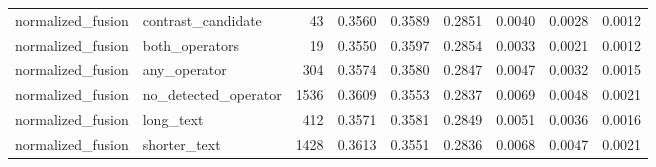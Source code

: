 \begin{tabular}{llrrrrrrr}
normalized_fusion & contrast_candidate & 43 & 0.3560 & 0.3589 & 0.2851 & 0.0040 & 0.0028 & 0.0012 \\
normalized_fusion & both_operators & 19 & 0.3550 & 0.3597 & 0.2854 & 0.0033 & 0.0021 & 0.0012 \\
normalized_fusion & any_operator & 304 & 0.3574 & 0.3580 & 0.2847 & 0.0047 & 0.0032 & 0.0015 \\
normalized_fusion & no_detected_operator & 1536 & 0.3609 & 0.3553 & 0.2837 & 0.0069 & 0.0048 & 0.0021 \\
normalized_fusion & long_text & 412 & 0.3571 & 0.3581 & 0.2849 & 0.0051 & 0.0036 & 0.0016 \\
normalized_fusion & shorter_text & 1428 & 0.3613 & 0.3551 & 0.2836 & 0.0068 & 0.0047 & 0.0021 \\
\bottomrule
\end{tabular}
